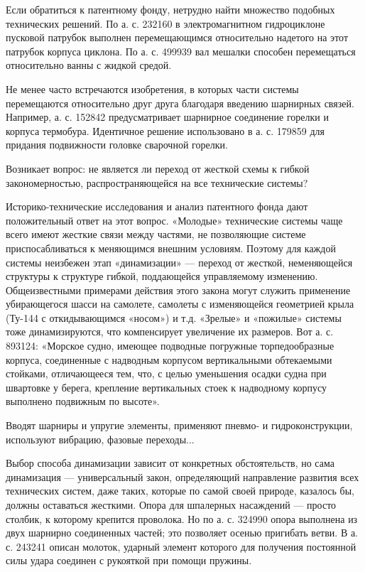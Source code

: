 Если обратиться к патентному  фонду, нетрудно найти множество подобных
технических решений.  По а. с. 232160  в электромагнитном гидроциклоне
пусковой  патрубок выполнен  перемещающимся  относительно надетого  на
этот патрубок  корпуса циклона. По  а. с. 499939 вал  мешалки способен
перемещаться относительно ванны с жидкой средой.

Не  менее  часто  встречаются  изобретения, в  которых  части  системы
перемещаются  относительно  друг  друга благодаря  введению  шарнирных
связей. Например,  а. с.  152842 предусматривает  шарнирное соединение
горелки и корпуса  термобура. Идентичное решение использовано  в а. с.
179859 для придания подвижности головке сварочной горелки.

Возникает вопрос:  не является  ли переход от  жесткой схемы  к гибкой
закономерностью, распространяющейся на все технические системы?

Историко-технические  исследования  и  анализ  патентного  фонда  дают
положительный  ответ на  этот  вопрос.  «Молодые» технические  системы
чаще  всего   имеют  жесткие  связи  между   частями,  не  позволяющие
системе приспосабливаться  к меняющимся внешним условиям.  Поэтому для
каждой  системы неизбежен  этап  «динамизации» —  переход от  жесткой,
неменяющейся  структуры к  структуре гибкой,  поддающейся управляемому
изменению.  Общеизвестными  примерами   действия  этого  закона  могут
служить  применение   убирающегося  шасси  на  самолете,   самолеты  с
изменяющейся геометрией крыла (Ту-144 с откидывающимся «носом») и т.д.
«Зрелые»  и «пожилые»  системы тоже  динамизируются, что  компенсирует
увеличение  их размеров.  Вот а.  с. 893124:  «Морское судно,  имеющее
подводные погружные  торпедообразные корпуса, соединенные  с надводным
корпусом вертикальными обтекаемыми стойками,  отличающееся тем, что, с
целью  уменьшения  осадки  судна  при швартовке  у  берега,  крепление
вертикальных  стоек  к  надводному   корпусу  выполнено  подвижным  по
высоте».

Вводят шарниры и упругие элементы, применяют пневмо- и
гидроконструкции, используют вибрацию, фазовые переходы...


Выбор  способа динамизации  зависит  от  конкретных обстоятельств,  но
сама  динамизация  —  универсальный  закон,  определяющий  направление
развития всех технических  систем, даже таких, которые  по самой своей
природе, казалось бы, должны  оставаться жесткими. Опора для шпалерных
насаждений — просто  столбик, к которому крепится проволока.  Но по а.
с. 324990  опора выполнена  из двух  шарнирно соединенных  частей; это
позволяет  осенью пригибать  ветви.  В а.  с.  243241 описан  молоток,
ударный элемент которого для  получения постоянной силы удара соединен
с рукояткой при помощи пружины.

